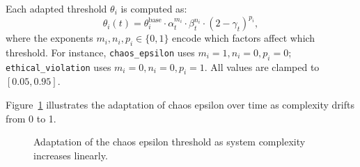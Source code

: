 Each adapted threshold $\theta_i$ is computed as:
\[
\theta_i(t) = \theta_i^{\text{base}} \cdot \alpha_t^{m_i} \cdot \beta_t^{n_i} \cdot (2 - \gamma_t)^{p_i},
\]
where the exponents $m_i, n_i, p_i \in \{0,1\}$ encode which factors affect
which threshold.  For instance, \texttt{chaos\_epsilon} uses $m_i=1, n_i=0, p_i=0$;  
\texttt{ethical\_violation} uses $m_i=0, n_i=0, p_i=1$.  All values are
clamped to $[0.05, 0.95]$.

Figure~\ref{fig:adapt} illustrates the adaptation of chaos epsilon over time
as complexity drifts from 0 to 1.

\begin{figure}[htbp]
\centering
{}
\caption{Adaptation of the chaos epsilon threshold as system complexity increases linearly.}
\label{fig:adapt}
\end{figure}
